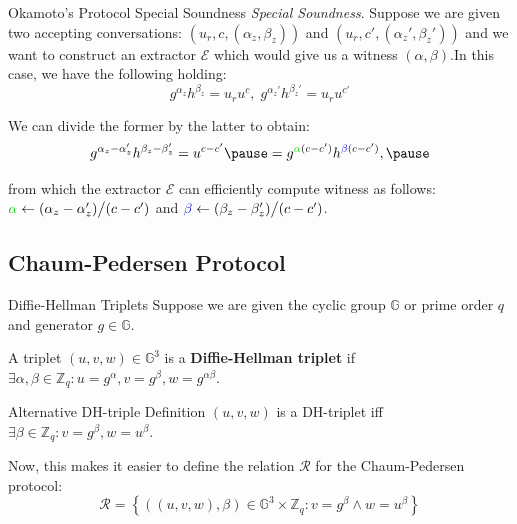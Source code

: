 \documentclass[xcolor={usenames,dvipsnames}]{beamer}
\begin{document}
    \begin{frame}{Okamoto's Protocol Special Soundness}
        \textit{Special Soundness}. Suppose we are given two accepting conversations: $(u_r,c,(\alpha_z,\beta_z))$ and $(u_r,c',(\alpha_z',\beta_z'))$ and we want to construct an extractor $\mathcal{E}$ which would give us a witness $(\alpha,\beta)$.\pause In this case, we have the following holding:
        \begin{equation*}
            g^{\alpha_z}h^{\beta_z} = u_r u^c, \; g^{\alpha_z'}h^{\beta_z'} = u_r u^{c'}
        \end{equation*}
        
        \pause We can divide the former by the latter to obtain:
        \begin{equation*}
            g^{\alpha_z - \alpha_z'}h^{\beta_z - \beta_z'} = u^{c-c'} \pause = g^{\textcolor{green!80!black}{\alpha}(c-c')}h^{\textcolor{blue!80!black}{\beta}(c-c')},\pause
        \end{equation*}

        from which the extractor $\mathcal{E}$ can efficiently compute witness as follows: $\textcolor{green!80!black}{\alpha} \gets (\alpha_z - \alpha_z')\big/(c-c')$ and $\textcolor{blue!80!black}{\beta} \gets (\beta_z - \beta_z')\big/(c-c')$.
    \end{frame}

    \subsection{Chaum-Pedersen Protocol}
    \begin{frame}{Diffie-Hellman Triplets}
        Suppose we are given the cyclic group $\mathbb{G}$ or prime order $q$ and generator $g \in \mathbb{G}$. \pause

        \begin{definition}
            A triplet $(u,v,w) \in \mathbb{G}^3$ is a \textbf{Diffie-Hellman triplet} if $\exists \alpha, \beta \in \mathbb{Z}_q: u = g^{\alpha}, v = g^{\beta}, w = g^{\alpha\beta}$.\pause
        \end{definition}

        \begin{block}{Alternative DH-triple Definition}
            $(u,v,w)$ is a DH-triplet iff $\exists \beta \in \mathbb{Z}_q: v = g^{\beta}, w = u^{\beta}$.\pause
        \end{block}

        Now, this makes it easier to define the relation $\mathcal{R}$ for the Chaum-Pedersen protocol:
        \begin{equation*}
            \mathcal{R} = \left\{ ((u,v,w), \beta) \in \mathbb{G}^3 \times \mathbb{Z}_q: v = g^{\beta} \wedge w = u^{\beta} \right\}
        \end{equation*}
    \end{frame}
\end{document}
